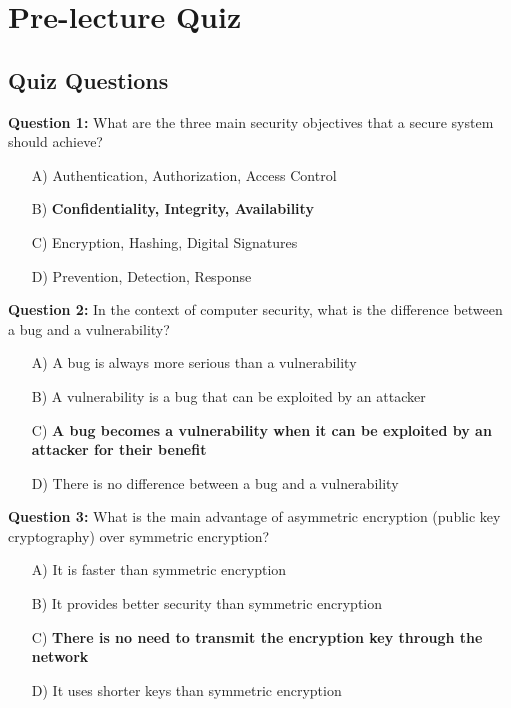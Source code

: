 \section{Pre-lecture Quiz}
\label{sec:sec:pre-quiz}

\subsection{Quiz Questions}

\textbf{Question 1:} What are the three main security objectives that a secure system should achieve?

\begin{enumerate}
    \item[A)] Authentication, Authorization, Access Control
    \item[B)] \textbf{Confidentiality, Integrity, Availability}
    \item[C)] Encryption, Hashing, Digital Signatures
    \item[D)] Prevention, Detection, Response
\end{enumerate}

\textbf{Question 2:} In the context of computer security, what is the difference between a bug and a vulnerability?

\begin{enumerate}
    \item[A)] A bug is always more serious than a vulnerability
    \item[B)] A vulnerability is a bug that can be exploited by an attacker
    \item[C)] \textbf{A bug becomes a vulnerability when it can be exploited by an attacker for their benefit}
    \item[D)] There is no difference between a bug and a vulnerability
\end{enumerate}

\textbf{Question 3:} What is the main advantage of asymmetric encryption (public key cryptography) over symmetric encryption?

\begin{enumerate}
    \item[A)] It is faster than symmetric encryption
    \item[B)] It provides better security than symmetric encryption
    \item[C)] \textbf{There is no need to transmit the encryption key through the network}
    \item[D)] It uses shorter keys than symmetric encryption
\end{enumerate}

